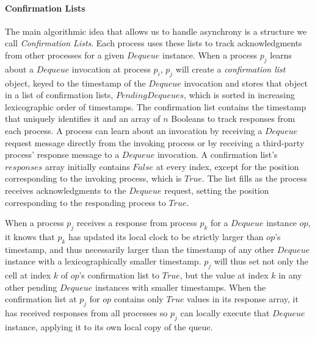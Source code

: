 \documentclass[a4paper,anonymous,USenglish]{lipics-v2021}
\theoremstyle{definition}
\begin{document}
\paragraph*{Confirmation Lists}
The main algorithmic idea that allows us to handle asynchrony is a structure we call \emph{Confirmation Lists}.  Each process uses these lists to track acknowledgments from other processes for a given $Dequeue$ instance.  When a process $p_j$ learns about a $Dequeue$ invocation at process $p_i$, $p_j$ will create a \emph{confirmation list} object, keyed to the timestamp of the $Dequeue$ invocation and stores that object in a list of confirmation lists, $PendingDequeues$, which is sorted in increasing lexicographic order of timestamps.  The confirmation list contains the timestamp that uniquely identifies it and an array of $n$ Booleans to track responses from each process.  A process can learn about an invocation by receiving a $Dequeue$ request message directly from the invoking process or by receiving a third-party process' response message to a $Dequeue$ invocation.  A confirmation list's $responses$ array initially contains $False$ at every index, except for the position corresponding to the invoking process, which is $True$.  The list fills as the process receives acknowledgments to the $Dequeue$ request, setting the position corresponding to the responding process to $True$.

When a process $p_j$ receives a response from process $p_k$ for a $Dequeue$ instance $op$, it knows that $p_k$ has updated its local clock to be strictly larger than $op$'s timestamp, and thus necessarily larger than the timestamp of any other $Dequeue$ instance with a lexicographically smaller timestamp.  $p_j$ will thus set not only the cell at index $k$ of $op$'s confirmation list to $True$, but the value at index $k$ in any other pending $Dequeue$ instances with smaller timestamps.  When the confirmation list at $p_j$ for $op$ contains only $True$ values in its response array, it has received responses from all processes so $p_j$ can locally execute that $Dequeue$ instance, applying it to its own local copy of the queue.  

\end{document}
